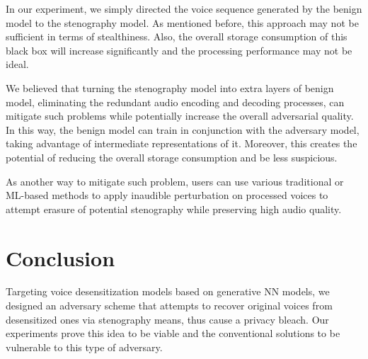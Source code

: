 \documentclass[journal]{IEEEtran} %
\begin{document}
\begin{CJK*}{UTF8}{gbsn}
In our experiment, we simply directed the voice sequence generated by the benign model to the stenography model. As mentioned before, this approach may not be sufficient in terms of stealthiness. Also, the overall storage consumption of this black box will increase significantly and the processing performance may not be ideal.

We believed that turning the stenography model into extra layers of benign model, eliminating the redundant audio encoding and decoding processes, can mitigate such problems while potentially increase the overall adversarial quality. In this way, the benign model can train in conjunction with the adversary model, taking advantage of intermediate representations of it. Moreover, this creates the potential of reducing the overall storage consumption and be less suspicious.

As another way to mitigate such problem, users can use various traditional or ML-based methods to apply inaudible perturbation on processed voices to attempt erasure of potential stenography while preserving high audio quality.

\section{Conclusion}

Targeting voice desensitization models based on generative NN models, we designed an adversary scheme that attempts to recover original voices from desensitized ones via stenography means, thus cause a privacy bleach. Our experiments prove this idea to be viable and the conventional solutions to be vulnerable to this type of adversary.

\end{CJK*}
\end{document}
